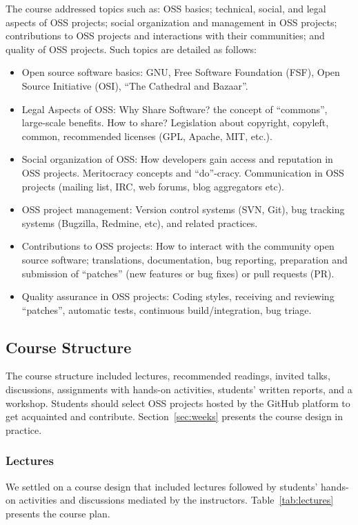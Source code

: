 \documentclass[sigconf]{acmart}
\begin{document}
The course addressed topics such as: 
OSS basics; technical, social, and legal aspects of OSS projects; social organization and management in OSS projects;  contributions to OSS projects and interactions with their communities; and quality of OSS projects. Such topics are detailed as follows:
\begin{itemize}
\item
    Open source software basics: GNU, Free Software Foundation (FSF), Open Source Initiative (OSI), ``The Cathedral and Bazaar''.
\item
   Legal Aspects of OSS: Why Share Software? the concept of
   ``commons'', large-scale benefits. How to share? Legislation
   about copyright, copyleft, common, recommended licenses (GPL, Apache,
   MIT, etc.).
\item
   Social organization of OSS: How developers gain access and
   reputation in OSS projects. Meritocracy concepts and
   ``do''-cracy. Communication in OSS projects (mailing list, IRC, web
   forums, blog aggregators etc).
\item
   OSS project management: Version control systems (SVN, Git), bug tracking systems (Bugzilla, Redmine, etc), and related practices.
\item
   Contributions to OSS projects: How to interact with the community
   open source software; translations, documentation, bug reporting, preparation and submission of ``patches'' (new features or bug fixes) or pull requests (PR).
\item
   Quality assurance in OSS projects: Coding styles,
   receiving and reviewing ``patches'', automatic tests,
   continuous build/integration, bug triage.
\end{itemize}

\subsection{Course Structure} \label{sec:structure}

The course structure included lectures, recommended readings, invited talks, discussions, assignments with hands-on activities, students' written reports, and a workshop.
Students should select OSS projects hosted by the GitHub platform to get acquainted and contribute. Section~\ref{sec:weeks} presents the course design in practice.

\subsubsection{Lectures}
We settled on a course design
that included lectures followed by students' hands-on activities and discussions mediated by the instructors.
Table~\ref{tab:lectures} presents the course plan.
\end{document}
